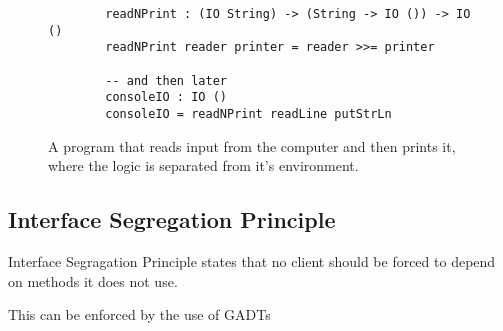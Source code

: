 \begin{figure}[H]
    \begin{lstlisting}
        readNPrint : (IO String) -> (String -> IO ()) -> IO ()
        readNPrint reader printer = reader >>= printer

        -- and then later
        consoleIO : IO ()
        consoleIO = readNPrint readLine putStrLn
    \end{lstlisting}
    \caption{A program that reads input from the computer and then prints it,
    where the logic is separated from it's environment.}
    \label{withdiexample}
\end{figure}

\subsection{Interface Segregation Principle} 

Interface Segragation Principle states that no client should be forced to depend
on methods it does not use. 

This can be enforced by the use of GADTs




